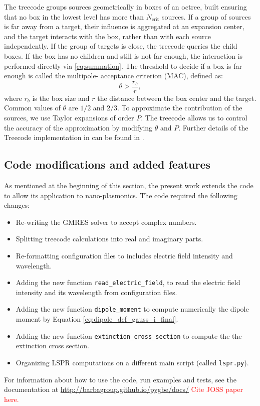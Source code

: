 The treecode groups sources geometrically in boxes of an octree, built ensuring
that no box in the lowest level has more than $N_\text{crit}$ sources. If a group of
sources is far away from a target, their influence is aggregated at an expansion center,
and the target interacts with the box, rather than with each source independently.
If the group of targets is  close, the treecode queries the child
boxes. If the box has no children and still is not far enough, the interaction is 
performed directly via \eqref{eq:summation}.
 The threshold to decide if a box is far enough is called the multipole-
acceptance criterion (MAC), defined as:
%
\begin{equation}
\theta > \frac{r_b}{r},
\end{equation}
%
\noindent where $r_b$ is the box size and $r$ the distance between the box center and the target.
Common values of $\theta$ are $1/2$ and $2/3$.
To approximate the contribution of the sources, we use Taylor expansions
of order $P$.
The treecode allows us to control the accuracy of the approximation by modifying $\theta$ and $P$.
Further details of the Treecode implementation in \pygbe can be found in \cite{CooperBarba-share154331,CooperBardhanBarba2013}.

\subsection{Code modifications and added features} \label{sec:code_imp}

As mentioned at the beginning of this section, the present work extends the \pygbe code
to allow its application to nano-plasmonics. 
The code required the following changes:

\begin{itemize}
    \item Re-writing the GMRES solver to accept complex numbers. 
    \item Splitting treecode calculations into real and imaginary parts.
    \item Re-formatting configuration files to includes electric field intensity and  wavelength.
    \item Adding the new function \texttt{read\_electric\_field}, to read the electric field intensity and its wavelength from configuration files.
    \item Adding the new function \texttt{dipole\_moment} to compute numerically the dipole moment by Equation \eqref{eq:dipole_def_gauss_i_final}.
    \item Adding the new function \texttt{extinction\_cross\_section} to compute the the extinction cross section.
    \item Organizing LSPR computations on a different main script (called \texttt{lspr.py}).
\end{itemize}

For information about how to use the code, run examples and tests, see the
\pygbe documentation at \url{http://barbagroup.github.io/pygbe/docs/}
\textcolor{red}{Cite JOSS paper here.}
